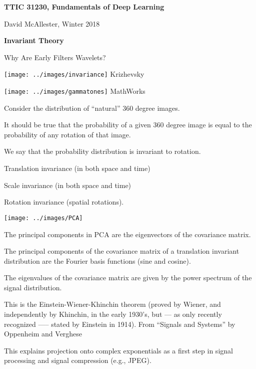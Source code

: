 



{\Huge

  \centerline{\bf TTIC 31230, Fundamentals of Deep Learning}
  \bigskip
  \centerline{David McAllester, Winter 2018}
  \vfill
  \centerline{\bf Invariant Theory}
  \vfill
  \vfill


Why Are Early Filters Wavelets?

\centerline{\texttt{[image: ../images/invariance]} {\large Krizhevsky}}


\vfill
\centerline{\texttt{[image: ../images/gammatones]} {\large MathWorks}}
           
Consider the distribution of ``natural'' 360 degree images.

\vfill
It should be true that the probability of a given 360 degree image is equal to the probability of any rotation of that image.

\vfill
We say that the probability distribution is invariant to rotation.


Translation invariance (in both space and time)

\vfill
Scale invariance (in both space and time)

\vfill
Rotation invariance (spatial rotations).


\centerline{\texttt{[image: ../images/PCA]}}

\vfill
The principal components in PCA are the eigenvectors of the covariance matrix.

\vfill
The principal components of the covariance matrix of a translation invariant distribution are the Fourier basis functions
(sine and cosine).

The eigenvalues of the covariance matrix are given by the power spectrum of the signal distribution.

\vfill
This is the Einstein-Wiener-Khinchin theorem (proved by Wiener, and independently
by Khinchin, in the early 1930’s, but --- as only recently recognized —--
stated by Einstein in 1914). {\huge From ``Signals and Systems'' by Oppenheim and Verghese}

\vfill
This explains projection onto complex exponentials as a first step in signal processing and signal compression (e.g., JPEG).

}

